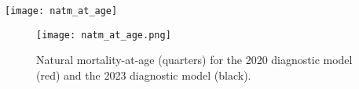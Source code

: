 \documentclass{article}
\begin{document}
\texttt{[image: natm\_at\_age]}

\begin{figure}[!ht]
  \centering
  \texttt{[image: natm\_at\_age.png]}
  \caption{Natural mortality-at-age (quarters) for the 2020 diagnostic model (red) and the 2023 diagnostic model (black). \label{fig:natm_at_age}}
\end{figure}
\end{document}
